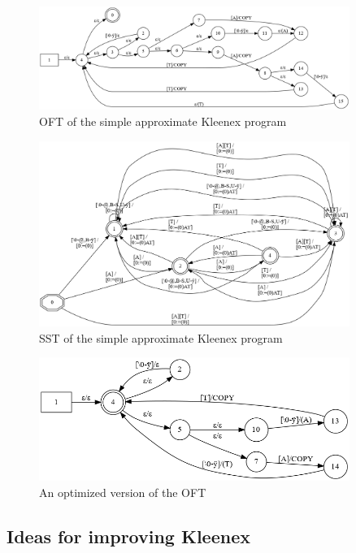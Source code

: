 \begin{figure}[!hb]
  \centering
  \includegraphics[width=0.9\textwidth]{images/oft.png}
  \caption{OFT of the simple approximate Kleenex program}
  \label{fig:oft}
\end{figure}
\begin{figure}[!hb]
  \centering
  \includegraphics[width=0.9\textwidth]{images/sst.png}
  \caption{SST of the simple approximate Kleenex program}
  \label{fig:sst}
\end{figure}

\begin{figure}[H]
  \centering
  \includegraphics[width=0.9\textwidth]{images/opt.png}
  \caption{An optimized version of the OFT}
  \label{fig:opt}
\end{figure}


\subsection{Ideas for improving Kleenex}

